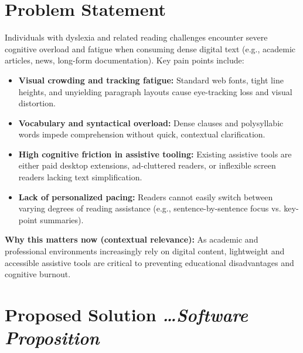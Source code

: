 \documentclass[11pt,a4paper]{article}
\newcommand{\BvrHint}[1]{%
  {\normalfont\normalsize\itshape\hfill #1}}
\begin{document}
\section{Problem Statement}
Individuals with dyslexia and related reading challenges encounter severe cognitive overload and fatigue when consuming dense digital text (e.g., academic articles, news, long-form documentation). Key pain points include:
\begin{itemize}[leftmargin=0.7cm]
    \item \textbf{Visual crowding and tracking fatigue:} Standard web fonts, tight line heights, and unyielding paragraph layouts cause eye-tracking loss and visual distortion.
    \item \textbf{Vocabulary and syntactical overload:} Dense clauses and polysyllabic words impede comprehension without quick, contextual clarification.
    \item \textbf{High cognitive friction in assistive tooling:} Existing assistive tools are either paid desktop extensions, ad-cluttered readers, or inflexible screen readers lacking text simplification.
    \item \textbf{Lack of personalized pacing:} Readers cannot easily switch between varying degrees of reading assistance (e.g., sentence-by-sentence focus vs. key-point summaries).
\end{itemize}

\textbf{Why this matters now (contextual relevance):} As academic and professional environments increasingly rely on digital content, lightweight and accessible assistive tools are critical to preventing educational disadvantages and cognitive burnout.

\section{Proposed Solution %
\BvrHint{\ldots Software Proposition}}
\end{document}
